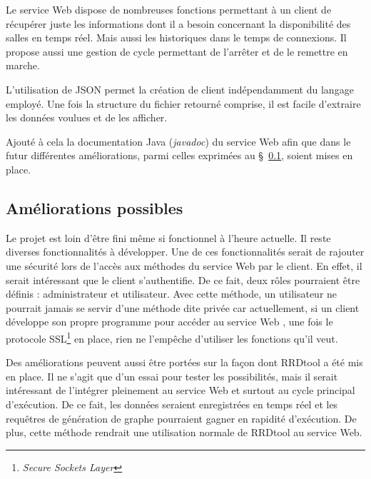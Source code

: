 Le service Web dispose de nombreuses fonctions permettant \`a un client de r\'ecup\'erer juste les informations dont il a besoin concernant la disponibilit\'e des salles en temps r\'eel.
Mais aussi les historiques dans le temps de connexions.
Il propose aussi une gestion de cycle permettant de l'arr\^eter et de le remettre en marche.

L'utilisation de JSON permet la cr\'eation de client ind\'ependamment du langage employ\'e.
Une fois la structure du fichier retourn\'e comprise, il est facile d'extraire les donn\'ees voulues et de les afficher.

Ajout\'e \`a cela la documentation Java (\textit{javadoc}) du service Web afin que dans le futur diff\'erentes am\'eliorations, parmi celles exprim\'ees au \S~\ref{section:amelioration}, soient mises en place.

\subsection{Am\'eliorations possibles}
\label{section:amelioration}

Le projet {\YuukouII} est loin d'\^etre fini m\^eme si fonctionnel \`a l'heure actuelle.
Il reste diverses fonctionnalit\'es \`a d\'evelopper.
Une de ces fonctionnalit\'es serait de rajouter une s\'ecurit\'e lors de l'acc\`es aux m\'ethodes du service Web par le client.
En effet, il serait int\'eressant que le client s'authentifie.
De ce fait, deux r\^oles pourraient \^etre d\'efinis : administrateur et utilisateur.
Avec cette m\'ethode, un utilisateur ne pourrait jamais se servir d'une m\'ethode dite priv\'ee car actuellement, si un client d\'eveloppe son propre programme pour acc\'eder au service Web {\YuukouII}, une fois le protocole SSL\protect\footnote{\textit{Secure Sockets Layer}} en place, rien ne l'emp\^eche d'utiliser les fonctions qu'il veut.

Des am\'eliorations peuvent aussi \^etre port\'ees sur la fa\c{c}on dont RRDtool a \'et\'e mis en place.
Il ne s'agit que d'un essai pour tester les possibilit\'es, mais il serait int\'eressant de l'int\'egrer pleinement au service Web et surtout au cycle principal d'ex\'ecution.
De ce fait, les donn\'ees seraient enregistr\'ees en temps r\'eel et les requ\^etres de g\'en\'eration de graphe pourraient gagner en rapidit\'e d'ex\'ecution.
De plus, cette m\'ethode rendrait une utilisation normale de RRDtool au service Web.

